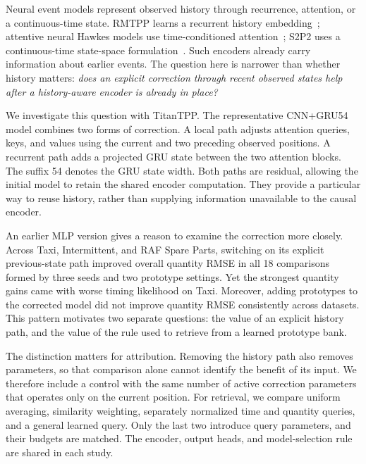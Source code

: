 \documentclass[runningheads]{llncs}
\newcommand{\method}{TitanTPP}
\begin{document}
Neural event models represent observed history through recurrence, attention, or a continuous-time state. RMTPP learns a recurrent history embedding~\cite{du2016rmtpp}; attentive neural Hawkes models use time-conditioned attention~\cite{yang2022anhp}; S2P2 uses a continuous-time state-space formulation~\cite{chang2025s2p2}. Such encoders already carry information about earlier events. The question here is narrower than whether history matters: \emph{does an explicit correction through recent observed states help after a history-aware encoder is already in place?}

We investigate this question with \method. The representative CNN+GRU54 model combines two forms of correction. A local path adjusts attention queries, keys, and values using the current and two preceding observed positions. A recurrent path adds a projected GRU state between the two attention blocks. The suffix 54 denotes the GRU state width. Both paths are residual, allowing the initial model to retain the shared encoder computation. They provide a particular way to reuse history, rather than supplying information unavailable to the causal encoder.

An earlier MLP version gives a reason to examine the correction more closely. Across Taxi, Intermittent, and RAF Spare Parts, switching on its explicit previous-state path improved overall quantity RMSE in all 18 comparisons formed by three seeds and two prototype settings. Yet the strongest quantity gains came with worse timing likelihood on Taxi. Moreover, adding prototypes to the corrected model did not improve quantity RMSE consistently across datasets. This pattern motivates two separate questions: the value of an explicit history path, and the value of the rule used to retrieve from a learned prototype bank.

The distinction matters for attribution. Removing the history path also removes parameters, so that comparison alone cannot identify the benefit of its input. We therefore include a control with the same number of active correction parameters that operates only on the current position. For retrieval, we compare uniform averaging, similarity weighting, separately normalized time and quantity queries, and a general learned query. Only the last two introduce query parameters, and their budgets are matched. The encoder, output heads, and model-selection rule are shared in each study.
\end{document}
